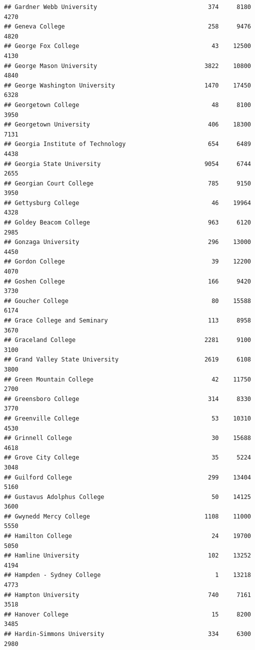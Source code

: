 \documentclass[
]{article}
\begin{document}
\begin{verbatim}
## Gardner Webb University                               374     8180       4270
## Geneva College                                        258     9476       4820
## George Fox College                                     43    12500       4130
## George Mason University                              3822    10800       4840
## George Washington University                         1470    17450       6328
## Georgetown College                                     48     8100       3950
## Georgetown University                                 406    18300       7131
## Georgia Institute of Technology                       654     6489       4438
## Georgia State University                             9054     6744       2655
## Georgian Court College                                785     9150       3950
## Gettysburg College                                     46    19964       4328
## Goldey Beacom College                                 963     6120       2985
## Gonzaga University                                    296    13000       4450
## Gordon College                                         39    12200       4070
## Goshen College                                        166     9420       3730
## Goucher College                                        80    15588       6174
## Grace College and Seminary                            113     8958       3670
## Graceland College                                    2281     9100       3100
## Grand Valley State University                        2619     6108       3800
## Green Mountain College                                 42    11750       2700
## Greensboro College                                    314     8330       3770
## Greenville College                                     53    10310       4530
## Grinnell College                                       30    15688       4618
## Grove City College                                     35     5224       3048
## Guilford College                                      299    13404       5160
## Gustavus Adolphus College                              50    14125       3600
## Gwynedd Mercy College                                1108    11000       5550
## Hamilton College                                       24    19700       5050
## Hamline University                                    102    13252       4194
## Hampden - Sydney College                                1    13218       4773
## Hampton University                                    740     7161       3518
## Hanover College                                        15     8200       3485
## Hardin-Simmons University                             334     6300       2980

\end{verbatim}
\end{document}
